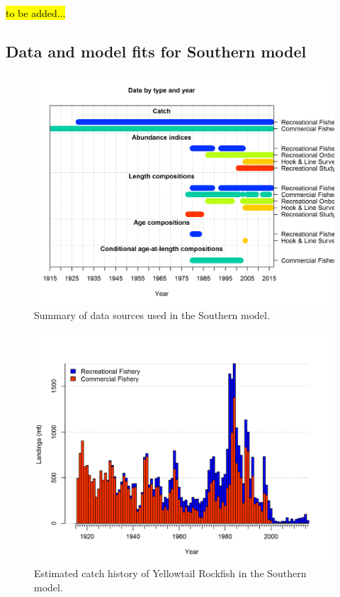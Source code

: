 \documentclass[12pt,]{article}
\begin{document}
\hl{to be added...}

\FloatBarrier

\newpage

\subsection{Data and model fits for Southern
model}\label{data-and-model-fits-for-southern-model}

\begin{figure}[htbp]
\centering
\includegraphics{r4ss/plots_mod2/data_plot.png}
\caption{Summary of data sources used in the Southern model.
\label{fig:data_plot}}
\end{figure}

\FloatBarrier

\newpage

\begin{figure}[htbp]
\centering
\includegraphics{r4ss/plots_mod2/catch2 landings stacked.png}
\caption{Estimated catch history of Yellowtail Rockfish in the Southern
model. \label{fig:r4ss_catch2_S}}
\end{figure}
\end{document}
